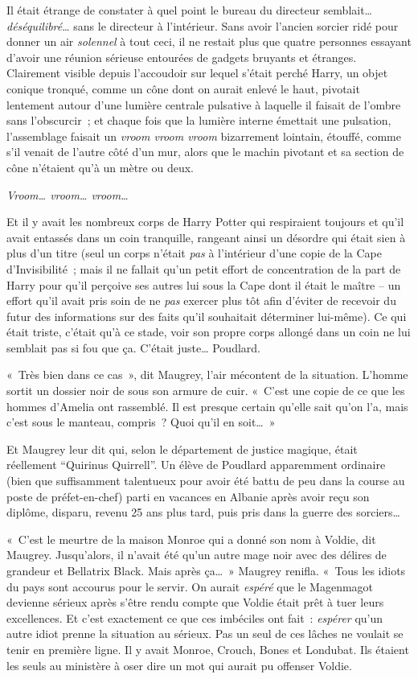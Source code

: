 Il était étrange de constater à quel point le bureau du directeur semblait…
\emph{déséquilibré}… sans le directeur à l'intérieur.
Sans avoir l'ancien sorcier ridé pour donner un air \emph{solennel} à tout ceci, il ne restait plus que quatre personnes essayant d'avoir une réunion sérieuse entourées de gadgets bruyants et étranges.
Clairement visible depuis l'accoudoir sur lequel s'était perché Harry, un objet conique tronqué, comme un cône dont on aurait enlevé le haut, pivotait lentement autour d'une lumière centrale pulsative à laquelle il faisait de l'ombre sans l'obscurcir~; et chaque fois que la lumière interne émettait une pulsation, l'assemblage faisait un \emph{vroom vroom vroom} bizarrement lointain, étouffé, comme s'il venait de l'autre côté d'un mur, alors que le machin pivotant et sa section de cône n'étaient qu'à un mètre ou deux.

\emph{Vroom… vroom… vroom…}

Et il y avait les nombreux corps de Harry Potter qui respiraient toujours et qu'il avait entassés dans un coin tranquille, rangeant ainsi un désordre qui était sien à plus d'un titre (seul un corps n'était \emph{pas} à l'intérieur d'une copie de la Cape d'Invisibilité~; mais il ne fallait qu'un petit effort de concentration de la part de Harry pour qu'il perçoive ses autres lui sous la Cape dont il était le maître -- un effort qu'il avait pris soin de ne \emph{pas} exercer plus tôt afin d'éviter de recevoir du futur des informations sur des faits qu'il souhaitait déterminer lui-même).
Ce qui était triste, c'était qu'à ce stade, voir son propre corps allongé dans un coin ne lui semblait pas si fou que ça.
C'était juste…
Poudlard.

«~Très bien dans ce cas~», dit Maugrey, l'air mécontent de la situation.
L'homme sortit un dossier noir de sous son armure de cuir.
«~C'est une copie de ce que les hommes d'Amelia ont rassemblé.
Il est presque certain qu'elle sait qu'on l'a, mais c'est sous le manteau, compris~?
Quoi qu'il en soit…~»

Et Maugrey leur dit qui, selon le département de justice magique, était réellement “Quirinus Quirrell”.
Un élève de Poudlard apparemment ordinaire (bien que suffisamment talentueux pour avoir été battu de peu dans la course au poste de préfet-en-chef) parti en vacances en Albanie après avoir reçu son diplôme, disparu, revenu 25 ans plus tard, puis pris dans la guerre des sorciers…

«~C'est le meurtre de la maison Monroe qui a donné son nom à Voldie, dit Maugrey.
Jusqu'alors, il n'avait été qu'un autre mage noir avec des délires de grandeur et Bellatrix Black.
Mais après ça…~»
Maugrey renifla.
«~Tous les idiots du pays sont accourus pour le servir.
On aurait \emph{espéré} que le Magenmagot devienne sérieux après s'être rendu compte que Voldie était prêt à tuer leurs excellences.
Et c'est exactement ce que ces imbéciles ont fait~: \emph{espérer} qu'un autre idiot prenne la situation au sérieux.
Pas un seul de ces lâches ne voulait se tenir en première ligne.
Il y avait Monroe, Crouch, Bones et Londubat.
Ils étaient les seuls au ministère à oser dire un mot qui aurait pu offenser Voldie.

